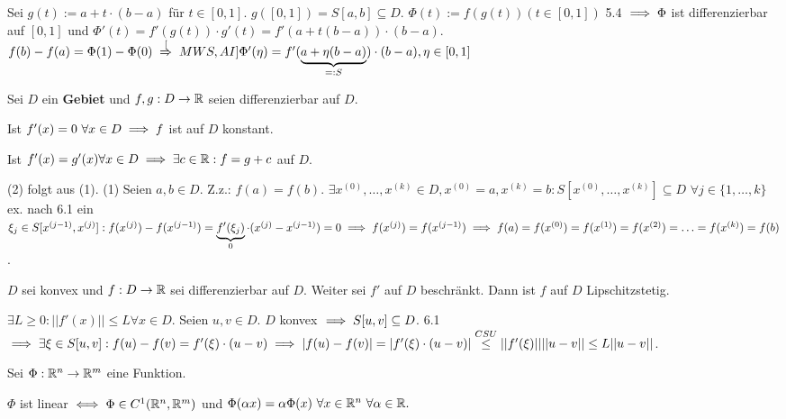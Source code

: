 \documentclass[a4paper,twoside,DIV15,BCOR12mm]{scrbook}
\begin{document}
\begin{beweis}
Sei $g(t):=a+t\cdot(b-a)$ für $t\in[0,1]$. $g([0,1])=S[a,b]\subseteq D$. $\Phi(t):=f(g(t)) (t \in [0,1])$ 5.4 $\implies \Phi$ ist differenzierbar auf $[0,1]$ und $\Phi'(t) = f'(g(t))\cdot g'(t) = f'(a+t(b-a))\cdot(b-a)$. $f(b)-f(a)=\Phi(1)-\Phi(0) \folgtnach[MWS, AI] \Phi'(\eta) = f'(\underbrace{a+\eta(b-a)}_{=:S})\cdot(b-a), \eta \in [0,1]$
\end{beweis}

\begin{folgerungen}
Sei $D$ ein \textbf{Gebiet} und $f,g:D\to\mathbb{R}$ seien differenzierbar auf $D$.
\begin{liste}
\item Ist $f'(x)=0\ \forall x \in D \implies f$ ist auf $D$ konstant.
\item Ist $f'(x)=g'(x) \forall x \in D \implies \exists c \in \mathbb{R}: f=g+c$ auf $D$.
\end{liste}
\end{folgerungen}

\begin{beweis}
(2) folgt aus (1). (1) Seien $a,b \in D$. Z.z.: $f(a)=f(b)$.
$\exists x^{(0)},\ldots,x^{(k)} \in D, x^{(0)}=a, x^{(k)}=b: S[x^{(0)},\ldots,x^{(k)}] \subseteq D$
$\forall j \in \{1,\ldots,k\}$ ex. nach 6.1 ein $\xi_j \in S[x^{(j-1)}, x^{(j)}]:
f(x^{(j)})-f(x^{(j-1)}) = \underbrace{f'(\xi_j)}_0\cdot(x^{(j)}-x^{(j-1)})=0
\implies f(x^{(j)}) = f(x^{(j-1)}) \implies f(a)=f(x^{(0)})=f(x^{(1)})=f(x^{(2)})=\ldots = f(x^{(k)}) = f(b)$.
\end{beweis}

\begin{satz}
$D$ sei konvex und $f:D\to\mathbb{R}$ sei differenzierbar auf $D$. Weiter sei $f'$ auf $D$ beschränkt. Dann ist $f$ auf $D$ Lipschitzstetig.
\end{satz}

\begin{beweis}
$\exists L \ge 0: ||f'(x)|| \le L \forall x \in D$. Seien $u,v \in D$. $D$ konvex $\implies S[u,v]\subseteq D$. 6.1 $\implies \exists\xi\in S[u,v]:f(u)-f(v)=f'(\xi)\cdot(u-v) \implies |f(u)-f(v)|=|f'(\xi)\cdot(u-v)|\stackrel{CSU}{\le}||f'(\xi)|| ||u-v|| \le L||u-v||$.
\end{beweis}

\begin{satz}[Linearität]
Sei $\Phi:\mathbb{R}^n\to\mathbb{R}^m$ eine Funktion.

$\Phi$ ist linear $\iff \Phi \in C^1(\mathbb{R}^n, \mathbb{R}^m)$ und $\Phi(\alpha x)=\alpha\Phi(x)\ \forall x \in \mathbb{R}^n\ \forall \alpha \in \mathbb{R}.$
\end{satz}
\end{document}

